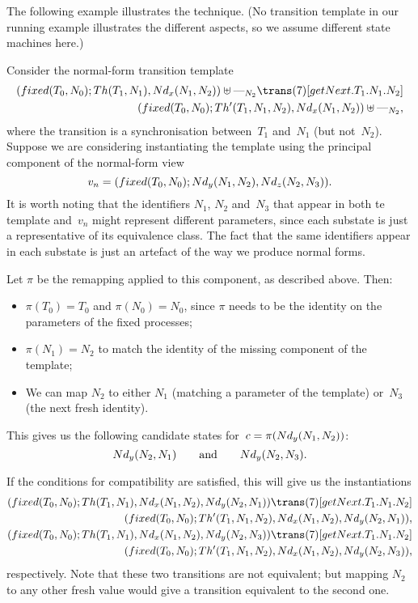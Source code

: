 The following example illustrates the technique.  (No transition template in
our running example illustrates the different aspects, so we assume different
state machines here.)
%
\begin{example}
\label{example:template-1}
Consider the normal-form transition template
\[
\begin{align}
(fixed(T_0,N_0); Th(T_1,N_1), \Node_x(N_1,N_2)) \uplus \bighole{N_2}
  \trans(7)[getNext.T_1.N_1.N_2] \\
\qquad
(fixed(T_0,N_0); Th'(T_1,N_1,N_2), \Node_x(N_1,N_2)) \uplus \bighole{N_2},
\end{align}
\]
where the transition is a synchronisation between~$T_1$ and~$N_1$ (but
not~$N_2$). 
Suppose we are considering instantiating the template using the principal
component of the normal-form view
\[
v_n = (fixed(T_0,N_0); Nd_y(N_1,N_2), Nd_z(N_2,N_3)).
\]
It is worth noting that the identifiers $N_1$, $N_2$ and~$N_3$ that appear in
both te template and~$v_n$ might represent different parameters, since each
substate is just a representative of its equivalence class.  The fact that the
same identifiers appear in each substate is just an artefact of the way we
produce normal forms.

Let $\pi$ be the remapping applied to this component, as described above.
Then:
%
\begin{itemize}
\item  $\pi(T_0) = T_0$ and $\pi(N_0) = N_0$, since $\pi$ needs to be the
identity on the parameters of the fixed processes;

\item $\pi(N_1) = N_2$ to match the identity of the missing component of the
  template;

\item We can map $N_2$ to either $N_1$ (matching a parameter of the template)
  or~$N_3$ (the next fresh identity).
\end{itemize}
%
This gives us the following candidate states for~$c = \pi(Nd_y(N_1,N_2))$:
\[
Nd_y(N_2,N_1) \qquad\mbox{and}\qquad Nd_y(N_2,N_3).
\]

If the conditions for compatibility are satisfied, this will give us the
instantiations
\[
\begin{align}
(fixed(T_0,N_0); Th(T_1,N_1), \Node_x(N_1,N_2), \Node_y(N_2,N_1))
  \trans(7)[getNext.T_1.N_1.N_2] \\
\qquad (fixed(T_0,N_0); Th'(T_1,N_1,N_2), \Node_x(N_1,N_2), \Node_y(N_2,N_1)),
\\
(fixed(T_0,N_0); Th(T_1,N_1), \Node_x(N_1,N_2), \Node_y(N_2,N_3))
  \trans(7)[getNext.T_1.N_1.N_2] \\
\qquad (fixed(T_0,N_0); Th'(T_1,N_1,N_2), \Node_x(N_1,N_2), \Node_y(N_2,N_3)),
\end{align}
\]
respectively.  Note that these two transitions are not equivalent; but mapping
$N_2$ to any other fresh value would give a transition equivalent to the
second one. 
\end{example}

